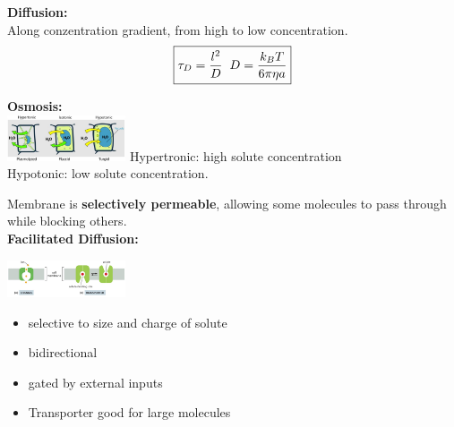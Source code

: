 
\begin{minipage}{0.5\linewidth}
    \textbf{Diffusion:}\\
    Along conzentration gradient, from high to low concentration.
        \[
    \boxed{        
            \tau_D = \frac{l^2}{D} 
            \hspace{2mm}
            D = \frac{k_B T}{6 \pi \eta a}
    }
    \]
    \vspace{7mm}
\end{minipage}
\begin{minipage}{0.5\linewidth}
    \textbf{Osmosis:}\\
        \includegraphics[width=35mm]{src/Images/osmosis.png}
        Hypertronic: high solute concentration\\
        Hypotonic: low solute concentration.\\
\end{minipage}

Membrane is \textbf{selectively permeable}, allowing some molecules to pass through while blocking others.\\

\textbf{Facilitated Diffusion:}\\
\begin{minipage}{0.42\linewidth}
    \includegraphics[width=35mm]{src/Images/channel.png}
\end{minipage}
\begin{minipage}{0.58 \linewidth}
    \begin{itemize}
        \item selective to size and charge of solute
        \item bidirectional
        \item gated by external inputs
        \item Transporter good for large molecules
    \end{itemize}
\end{minipage}